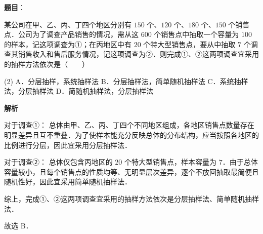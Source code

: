 \begin{answer}

\textbf{题目}：

某公司在甲、乙、丙、丁四个地区分别有 $150$ 个、$120$ 个、$180$ 个、$150$ 个销售点．公司为了调查产品销售的情况，需从这 $600$ 个销售点中抽取一个容量为 $100$ 的样本，记这项调查为①；在丙地区中有 $20$ 个特大型销售点，要从中抽取 $7$ 个调查其销售收入和售后服务情况，记这项调查为②．则完成①、②这两项调查宜采用的抽样方法依次是\mbox{（　　）}

\begin{gkopts}(2)
\task A．分层抽样，系统抽样法
\task B．分层抽样法，简单随机抽样法
\task C．系统抽样法，分层抽样法
\task D．简随机抽样法，分层抽样法
\end{gkopts}

\textbf{解析}

对于调查①：
总体由甲、乙、丙、丁四个不同地区组成，各地区销售点数量存在明显差异且互不重叠．为了使样本能充分反映总体的分布结构，应当按照各地区的比例进行分层，因此宜采用分层抽样法．

对于调查②：
总体仅包含丙地区的 $20$ 个特大型销售点，样本容量为 $7$．由于总体容量较小，且每个销售点的性质均等、无明显层次差异，逐个不放回抽取最简便且随机性好，因此宜采用简单随机抽样法．

综上，完成①、②这两项调查宜采用的抽样方法依次是分层抽样法、简单随机抽样法．

故选 B．


\end{answer}
